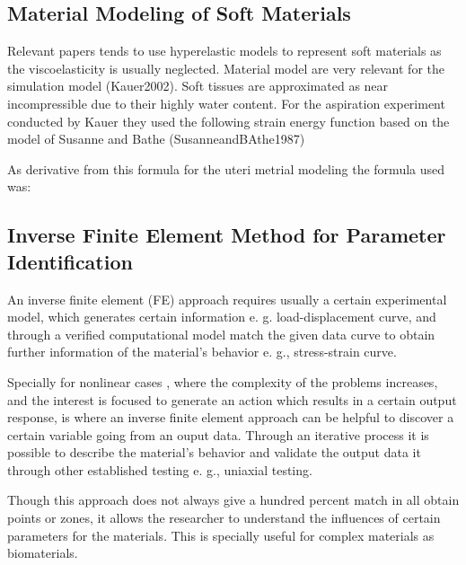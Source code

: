 \subsection{Material Modeling of Soft Materials}
 
Relevant papers tends to use hyperelastic models to represent soft materials as the viscoelasticity 
is usually neglected. 
Material model are very relevant for the simulation model (Kauer2002).
Soft tissues are approximated as near incompressible due to their highly water content.  
For the aspiration experiment conducted by Kauer they used the following strain energy
function based on the model of Susanne and Bathe (SusanneandBAthe1987)


As derivative from this formula for the uteri metrial modeling the formula used was:

\subsection{Inverse Finite Element Method for Parameter Identification}

An inverse finite element (FE) approach requires usually a certain experimental model,
 which generates certain information e. g. load-displacement curve, and through 
a verified computational model match the given data curve to obtain further information 
of the material's behavior e. g., stress-strain curve.

Specially for nonlinear cases \cite{Husain2004}, where the complexity of the problems 
increases, and the interest is focused to generate an action which results in a 
certain output response, is where an inverse finite element approach can be helpful 
to discover a certain variable going from an ouput data. Through an iterative process it is 
possible to describe the material's behavior and validate the output data it 
through other established testing e. g., uniaxial testing.

Though this approach does not always give a hundred percent match in all obtain points 
or zones, it allows the researcher to understand the influences of certain parameters 
for the materials. This is specially useful for complex materials as biomaterials. 

